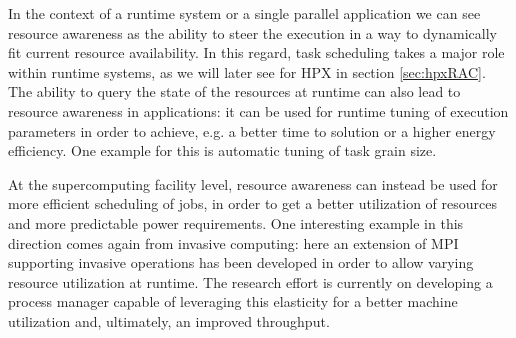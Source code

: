 In the context of a runtime system or a single parallel application we can see resource awareness as the ability to steer the execution in a way to dynamically fit current resource availability. In this regard, task scheduling takes a major role within runtime systems, as we will later see for HPX in section \ref{sec:hpxRAC}. The ability to query the state of the resources at runtime can also lead to resource awareness in applications: it can be used for runtime tuning of execution parameters in order to achieve, e.g. a better time to solution or a higher energy efficiency. One example for this is automatic tuning of task grain size\cite{grubel2016dynamic}.

At the supercomputing facility level, resource awareness can instead be used for more efficient scheduling of jobs, in order to get a better utilization of resources and more predictable power requirements. One interesting example in this direction comes again from invasive computing: here an extension of MPI supporting invasive operations has been developed in order to allow varying resource utilization at runtime\cite{urena2012invasive}. The research effort is currently on developing a process manager capable of leveraging this elasticity for a better machine utilization and, ultimately, an improved throughput.


